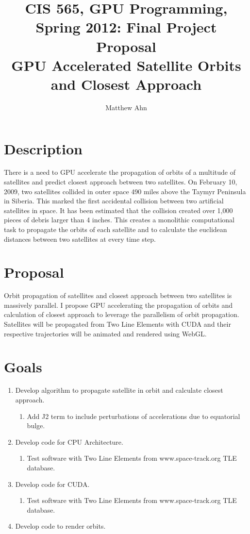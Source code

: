 \documentclass[english]{article}
\title{CIS 565, GPU Programming, Spring 2012: Final Project Proposal \\ GPU Accelerated Satellite Orbits and Closest Approach}
\author{Matthew Ahn}
\begin{document}
\maketitle
\section*{Description}
There is a need to GPU accelerate the propagation of orbits of a multitude of satellites and predict closest approach between two satellites. On February 10, 2009, two satellites collided in outer space 490 miles above the Taymyr Peninsula in Siberia. This marked the first accidental collision between two artificial satellites in space\cite{satellitecollision2009}. It has been estimated that the collision created over 1,000 pieces of debris larger than 4 inches\cite{satellitecollision2009}. This creates a monolithic computational task to propagate the orbits of each satellite and to calculate the euclidean distances between two satellites at every time step. 

\section*{Proposal}
Orbit propagation of satellites and closest approach between two satellites is massively parallel. I propose GPU accelerating the propagation of orbits and calculation of closest approach to leverage the parallelism of orbit propagation. Satellites will be propagated from Two Line Elements with CUDA and their respective trajectories will be animated and rendered using WebGL.

\section*{Goals}
\begin{enumerate}
\item Develop algorithm to propagate satellite in orbit and calculate closest approach.
\begin{enumerate}
\item Add J2 term to include perturbations of accelerations due to equatorial bulge.
\end{enumerate}
\item Develop code for CPU Architecture.
\begin{enumerate}
\item Test software with Two Line Elements from www.space-track.org TLE database.
\end{enumerate}
\item Develop code for CUDA.
\begin{enumerate}
\item Test software with Two Line Elements from www.space-track.org TLE database.
\end{enumerate}
\item Develop code to render orbits.

\end{enumerate}




    
    
\end{document}
